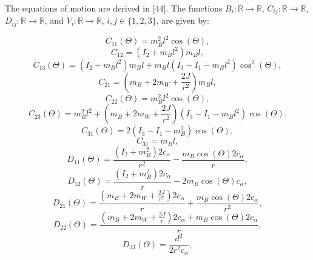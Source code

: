 	
	The equations of motion are derived in [44]. The functions $B_i: \mathbb{R} \rightarrow \mathbb{R}$, $C_{ij}: \mathbb{R} \rightarrow \mathbb{R}$, $D_{ij}: \mathbb{R} \rightarrow \mathbb{R}$, and $V_i: \mathbb{R} \rightarrow \mathbb{R}$, $i,j \in \{1,2,3\}$, are given by:
	
	\begin{equation}
		C_{11}(\Theta) = m_B^2 l^2 \cos(\Theta),
	\end{equation}
	\begin{equation}
		C_{12} = (I_2 + m_B l^2) m_B l,
	\end{equation}
	\begin{equation}
		C_{13}(\Theta) = (I_2 + m_B l^2) m_B l + m_B l (I_3 - I_1 - m_B l^2) \cos^2(\Theta),
	\end{equation}
	\begin{equation}
		C_{21} = (m_B + 2m_W + \frac{2J}{r^2}) m_B l,
	\end{equation}
	\begin{equation}
		C_{22}(\Theta) = m_B^2 l^2 \cos(\Theta),
	\end{equation}
	\begin{equation}
		C_{23}(\Theta) = m_B^2 l^2 + (m_B + 2m_W + \frac{2J}{r^2}) (I_3 - I_1 - m_B l^2) \cos(\Theta).
	\end{equation}
	\begin{equation}
		C_{31}(\Theta) = 2 (I_3 - I_1 - m_B^2) \cos(\Theta),
	\end{equation}
	\begin{equation}
		C_{31} = m_B l,
	\end{equation}
	\begin{equation}
		D_{11}(\Theta) = \frac{(I_2 + m_B^2) 2c_\alpha}{r^2} - \frac{m_B \cos(\Theta) 2c_\alpha}{r},
	\end{equation}
	\begin{equation}
		D_{12}(\Theta) = \frac{(I_2 + m_B^2) 2c_\alpha}{r} - 2m_B \cos(\Theta) c_\alpha,
	\end{equation}
	\begin{equation}
		D_{21}(\Theta) = \frac{(m_B + 2m_W + \frac{2J}{r^2}) 2c_\alpha}{r} + \frac{m_B \cos(\Theta) 2c_\alpha}{r^2},
	\end{equation}
	\begin{equation}
		D_{22}(\Theta) = \frac{(m_B + 2m_W + \frac{2J}{r}) 2c_\alpha + m_B \cos(\Theta) 2c_\alpha}{r},
	\end{equation}
	\begin{equation}
		D_{33}(\Theta) = \frac{d^2}{2r^2 c_\alpha},
	\end{equation}

